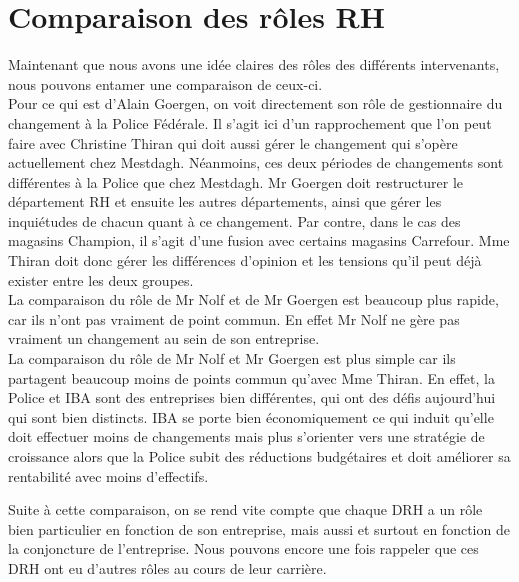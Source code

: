 \section{Comparaison des rôles RH}

Maintenant que nous avons une idée claires des rôles des différents intervenants, nous pouvons entamer une comparaison de ceux-ci. \\


Pour ce qui est d'Alain Goergen, on voit directement son rôle de gestionnaire du changement à la Police Fédérale. Il s'agit ici d'un rapprochement que l'on peut faire avec Christine Thiran qui doit aussi gérer le changement qui s'opère actuellement chez Mestdagh. Néanmoins, ces deux périodes de changements sont différentes à la Police que chez Mestdagh. Mr Goergen doit restructurer le département RH et ensuite les autres départements, ainsi que gérer les inquiétudes de chacun quant à ce changement. Par contre, dans le cas des magasins Champion, il s'agit d'une fusion avec certains magasins Carrefour. Mme Thiran doit donc gérer les différences d'opinion et les tensions qu'il peut déjà exister entre les deux groupes. \\


La comparaison du rôle de Mr Nolf et de Mr Goergen est beaucoup plus rapide, car ils n'ont pas vraiment de point commun. En effet Mr Nolf ne gère pas vraiment un changement au sein de son entreprise. \\

La comparaison du rôle de Mr Nolf et Mr Goergen est plus simple car ils partagent beaucoup moins de points commun qu'avec Mme Thiran. En effet, la Police et IBA sont des entreprises bien différentes, qui ont des défis aujourd'hui qui sont bien distincts. IBA se porte bien économiquement ce qui induit qu'elle doit effectuer moins de changements mais plus s'orienter vers une stratégie de croissance alors que la Police subit des réductions budgétaires et doit améliorer sa rentabilité avec moins d'effectifs. 


Suite à cette comparaison, on se rend vite compte que chaque DRH a un rôle bien particulier en fonction de son entreprise, mais aussi et surtout en fonction de la conjoncture de l'entreprise. Nous pouvons encore une fois rappeler que ces DRH ont eu d'autres rôles au cours de leur carrière. 

